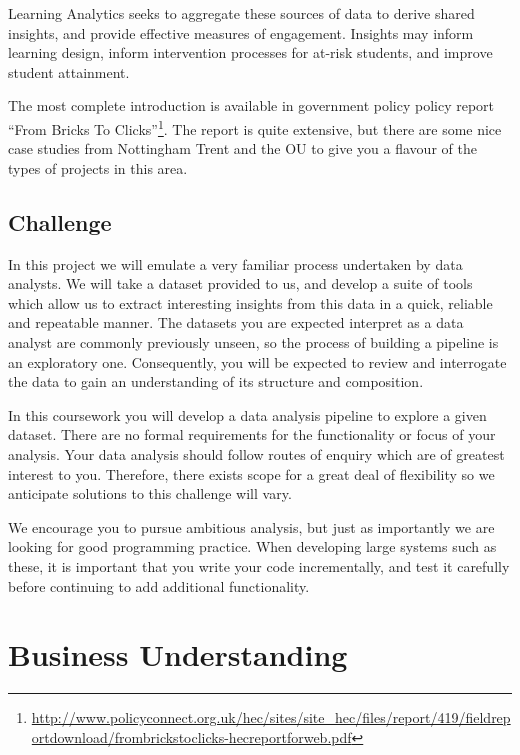 \documentclass[
]{article}
\begin{document}
Learning Analytics seeks to aggregate these sources of data to derive
shared insights, and provide effective measures of engagement. Insights
may inform learning design, inform intervention processes for at-risk
students, and improve student attainment.

The most complete introduction is available in government policy policy
report ``From Bricks To Clicks''\footnote{\url{http://www.policyconnect.org.uk/hec/sites/site_hec/files/report/419/fieldreportdownload/frombrickstoclicks-hecreportforweb.pdf}}.
The report is quite extensive, but there are some nice case studies from
Nottingham Trent and the OU to give you a flavour of the types of
projects in this area.

\hypertarget{challenge}{%
\subsection{Challenge}\label{challenge}}

In this project we will emulate a very familiar process undertaken by
data analysts. We will take a dataset provided to us, and develop a
suite of tools which allow us to extract interesting insights from this
data in a quick, reliable and repeatable manner. The datasets you are
expected interpret as a data analyst are commonly previously unseen, so
the process of building a pipeline is an exploratory one. Consequently,
you will be expected to review and interrogate the data to gain an
understanding of its structure and composition.

In this coursework you will develop a data analysis pipeline to explore
a given dataset. There are no formal requirements for the functionality
or focus of your analysis. Your data analysis should follow routes of
enquiry which are of greatest interest to you. Therefore, there exists
scope for a great deal of flexibility so we anticipate solutions to this
challenge will vary.

We encourage you to pursue ambitious analysis, but just as importantly
we are looking for good programming practice. When developing large
systems such as these, it is important that you write your code
incrementally, and test it carefully before continuing to add additional
functionality.

\newpage

\hypertarget{business-understanding}{%
\section{Business Understanding}\label{business-understanding}}
\end{document}
